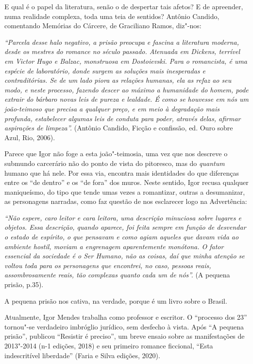 \documentclass[11pt]{extarticle}
\begin{document}
E qual é o papel da literatura, senão o de despertar tais afetos? E de
apreender, numa realidade complexa, toda uma teia de sentidos? Antônio
Candido, comentando Memórias do Cárcere, de Graciliano Ramos, diz"-nos:

\emph{``Parcela desse halo negativo, a prisão preocupa e fascina a
literatura moderna, desde os mestres do romance no século passado.
Atenuada em Dickens, terrível em Victor Hugo e Balzac, monstruosa em
Dostoievski. Para o romancista, é uma espécie de laboratório, donde
surgem as soluções mais inesperadas e contraditórias. Se de um lado
piora as relações humanas, ela as refaz ao seu modo, e neste processo,
fazendo descer ao máximo a humanidade do homem, pode extrair do bárbaro
novas leis de pureza e lealdade. É como se houvesse em nós um
joão-teimoso que precisa a qualquer preço, e em meio à degradação mais
profunda, estabelecer algumas leis de conduta para poder, através delas,
afirmar aspirações de limpeza''.} (Antônio Candido, Ficção e confissão,
ed. Ouro sobre Azul, Rio, 2006).

Parece que Igor não foge a esta joão"-teimosia, uma vez que nos descreve
o submundo carcerário não do ponto de vista do pitoresco, mas do
\emph{quantum} humano que há nele. Por essa via, encontra mais
identidades do que diferenças entre os ``de dentro'' e os ``de fora''
dos muros. Neste sentido, Igor recusa qualquer maniqueísmo, do tipo que
tende umas vezes a romantizar, outras a desumanizar, as personagens
narradas, como faz questão de nos esclarecer logo na Advertência:

\emph{``Não espere, caro leitor e cara leitora, uma descrição minuciosa
sobre lugares e objetos. Essa descrição, quando aparece, foi feita
sempre em função de desvendar o estado de espírito, o que pensavam e
como agiam aqueles que davam vida ao ambiente hostil, moviam a
engrenagem aparentemente monótona. O fator essencial da sociedade é o
Ser Humano, não as coisas, daí que minha atenção se voltou toda para os
personagens que encontrei, no caso, pessoas reais, assombrosamente
reais, tão complexas quanto cada um de nós''.} (A pequena prisão, p.35).

A pequena prisão nos cativa, na verdade, porque é um livro sobre o
Brasil.

Atualmente, Igor Mendes trabalha como professor e escritor. O ``processo
dos 23'' tornou"-se verdadeiro imbróglio jurídico, sem desfecho à vista.
Após ``A pequena prisão'', publicou ``Resistir é preciso'', um breve
ensaio sobre as manifestações de 2013"-2014 (n-1 edições, 2018) e seu
primeiro romance ficcional, ``Esta indescritível liberdade'' (Faria e
Silva edições, 2020).
\end{document}
